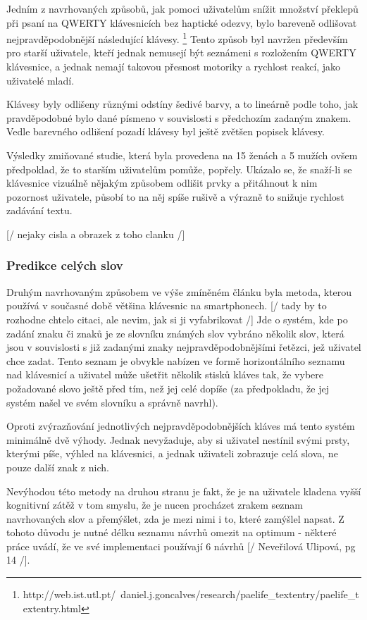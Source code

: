 \documentclass{article}
\begin{document}
Jedním z navrhovaných způsobů, jak pomoci uživatelům snížit množství překlepů při psaní na QWERTY klávesnicích bez haptické odezvy, bylo bareveně odlišovat nejpravděpodobnější následující klávesy. \footnote{http://web.ist.utl.pt/~daniel.j.goncalves/research/paelife\_textentry/paelife\_textentry.html} Tento způsob byl navržen především pro starší uživatele, kteří jednak nemusejí být seznámeni s rozložením QWERTY klávesnice, a jednak nemají takovou přesnost motoriky a rychlost reakcí, jako uživatelé mladí. 

Klávesy byly odlišeny různými odstíny šedivé barvy, a to lineárně podle toho, jak pravděpodobné bylo dané písmeno v souvislosti s předchozím zadaným znakem. Vedle barevného odlišení pozadí klávesy byl ještě zvětšen popisek klávesy.

Výsledky zmiňované studie, která byla provedena na 15 ženách a 5 mužích ovšem předpoklad, že to starším uživatelům pomůže, popřely. Ukázalo se, že snaží-li se klávesnice vizuálně nějakým způsobem odlišit prvky a přitáhnout k nim pozornost uživatele, působí to na něj spíše rušivě a výrazně to snižuje rychlost zadávání textu. 

[/ nejaky cisla a obrazek z toho clanku /]

\subsubsection{Predikce celých slov}

Druhým navrhovaným způsobem ve výše zmíněném článku byla metoda, kterou používá v současné době většina klávesnic na smartphonech. 
[/ tady by to rozhodne chtelo citaci, ale nevim, jak si ji vyfabrikovat /]
Jde o systém, kde po zadání znaku či znaků je ze slovníku známých slov vybráno několik slov, která jsou v souvislosti s již zadanými znaky nejpravděpodobnějšími řetězci, jež uživatel chce zadat. Tento seznam je obvykle nabízen ve formě horizontálního seznamu nad klávesnicí a uživatel může ušetřit několik stisků kláves tak, že vybere požadované slovo ještě před tím, než jej celé dopíše (za předpokladu, že jej systém našel ve svém slovníku a správně navrhl). 

Oproti zvýrazňování jednotlivých nejpravděpodobnějších kláves má tento systém minimálně dvě výhody. Jednak nevyžaduje, aby si uživatel nestínil svými prsty, kterými píše, výhled na klávesnici, a jednak uživateli zobrazuje celá slova, ne pouze další znak z nich. 

Nevýhodou této metody na druhou stranu je fakt, že je na uživatele kladena vyšší kognitivní zátěž v tom smyslu, že je nucen procházet zrakem seznam navrhovaných slov a přemýšlet, zda je mezi nimi i to, které zamýšlel napsat. Z tohoto důvodu je nutné délku seznamu návrhů omezit na optimum - některé práce uvádí, že ve své implementaci používají 6 návrhů [/ Neveřilová Ulipová, pg 14 /]. 
\end{document}
